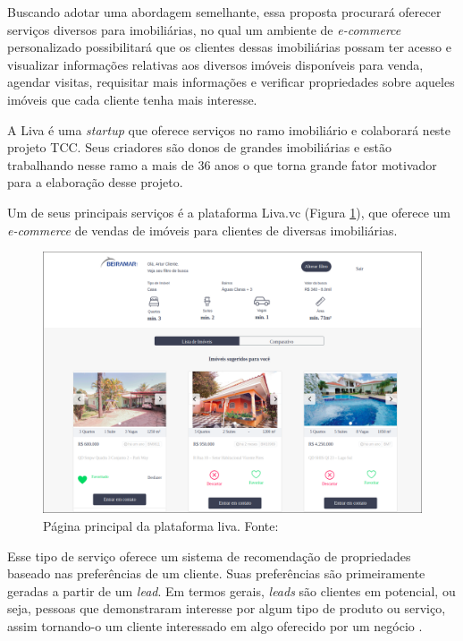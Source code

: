 Buscando adotar uma abordagem semelhante, essa proposta procurará oferecer serviços diversos para imobiliárias, no qual um ambiente de \textit{e-commerce} personalizado possibilitará que os clientes dessas imobiliárias possam ter acesso e visualizar informações relativas aos diversos imóveis disponíveis para venda, agendar visitas, requisitar mais informações e verificar propriedades sobre aqueles imóveis que cada cliente tenha mais interesse.

A Liva é uma \textit{startup} que oferece serviços no ramo imobiliário e colaborará neste projeto TCC. Seus criadores são donos de grandes imobiliárias e estão trabalhando nesse ramo a mais de 36 anos o que torna grande fator motivador para a elaboração desse projeto. 

Um de seus principais serviços é a plataforma Liva.vc (Figura \ref{fig:pagina_principal_liva}), que oferece um \textit{e-commerce} de vendas de imóveis para clientes de diversas imobiliárias.

\begin{figure}[H]
    \centering
    \includegraphics[scale=0.3]{figuras/introducao/pagina_principal_liva.png}
    \caption[Página principal da plataforma Liva.vc]{Página principal da plataforma liva. Fonte: \cite{Liva:2019}}
    \label{fig:pagina_principal_liva}
\end{figure}


Esse tipo de serviço oferece um sistema de recomendação de propriedades baseado nas preferências de um cliente. Suas preferências são primeiramente geradas a partir de um \textit{lead}. Em termos gerais, \textit{leads} são clientes em potencial, ou seja, pessoas que demonstraram interesse por algum tipo de produto ou serviço, assim tornando-o um cliente interessado em algo oferecido por um negócio \cite{Agenciakaizen:2019}.

